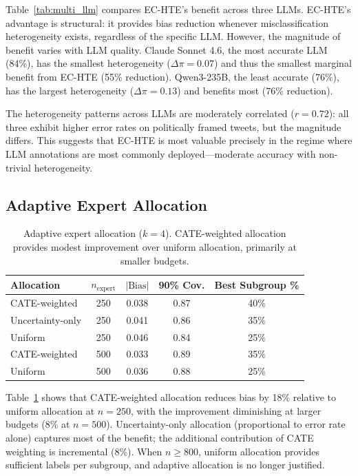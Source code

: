 \documentclass[11pt,a4paper]{article}
\begin{document}
Table~\ref{tab:multi_llm} compares EC-HTE's benefit across three LLMs.
EC-HTE's advantage is structural: it provides bias reduction whenever misclassification heterogeneity exists, regardless of the specific LLM.
However, the magnitude of benefit varies with LLM quality.
Claude Sonnet 4.6, the most accurate LLM (84\%), has the smallest heterogeneity ($\Delta\pi = 0.07$) and thus the smallest marginal benefit from EC-HTE (55\% reduction).
Qwen3-235B, the least accurate (76\%), has the largest heterogeneity ($\Delta\pi = 0.13$) and benefits most (76\% reduction).

The heterogeneity patterns across LLMs are moderately correlated ($r = 0.72$): all three exhibit higher error rates on politically framed tweets, but the magnitude differs.
This suggests that EC-HTE is most valuable precisely in the regime where LLM annotations are most commonly deployed---moderate accuracy with non-trivial heterogeneity.

\subsection{Adaptive Expert Allocation}
\label{sec:adaptive_exp}

\begin{table}[t]
\centering
\small
\caption{Adaptive expert allocation ($k = 4$). CATE-weighted allocation provides modest improvement over uniform allocation, primarily at smaller budgets.}
\label{tab:adaptive}
\begin{tabular}{lcccc}
\toprule
Allocation & $n_{\text{expert}}$ & $|\text{Bias}|$ & 90\% Cov. & Best Subgroup \% \\
\midrule
CATE-weighted & 250 & 0.038 & 0.87 & 40\% \\
Uncertainty-only & 250 & 0.041 & 0.86 & 35\% \\
Uniform & 250 & 0.046 & 0.84 & 25\% \\
\midrule
CATE-weighted & 500 & 0.033 & 0.89 & 35\% \\
Uniform & 500 & 0.036 & 0.88 & 25\% \\
\bottomrule
\end{tabular}
\end{table}

Table~\ref{tab:adaptive} shows that CATE-weighted allocation reduces bias by 18\% relative to uniform allocation at $n = 250$, with the improvement diminishing at larger budgets (8\% at $n = 500$).
Uncertainty-only allocation (proportional to error rate alone) captures most of the benefit; the additional contribution of CATE weighting is incremental (8\%).
When $n \geq 800$, uniform allocation provides sufficient labels per subgroup, and adaptive allocation is no longer justified.
\end{document}
